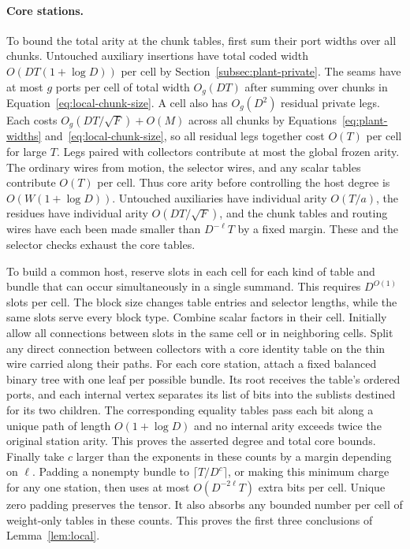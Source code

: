 \paragraph{Core stations.}
To bound the total arity at the chunk tables, first sum their port widths
over all chunks. Untouched auxiliary insertions have total coded width
\(O(DT(1+\log D))\) per cell by Section~\ref{subsec:plant-private}.
The seams have at most \(g\) ports per cell of total width \(O_g(DT)\)
after summing over chunks in Equation~\eqref{eq:local-chunk-size}.
A cell also has \(O_g(D^2)\) residual private legs. Each costs
\(O_g(DT/\sqrt F)+O(M)\) across all chunks by
Equations~\eqref{eq:plant-widths} and~\eqref{eq:local-chunk-size},
so all residual legs together cost \(O(T)\) per cell for large \(T\).
Legs paired with collectors contribute at most the global frozen arity.
The ordinary wires from motion, the selector wires, and any scalar
tables contribute \(O(T)\) per cell. Thus core arity before controlling the host
degree is \(O(W(1+\log D))\). Untouched auxiliaries have individual
arity \(O(T/a)\), the residues have individual arity
\(O(DT/\sqrt F)\), and the chunk tables and routing wires have each been
made smaller than \(D^{-\ell}T\) by a fixed margin. These and the
selector checks exhaust the core tables.

To build a common host, reserve slots in each cell for each kind of
table and bundle that can occur simultaneously in a single summand.
This requires \(D^{O(1)}\) slots per cell. The block size changes table
entries and selector lengths, while the same slots serve every block
type. Combine scalar factors in their cell. Initially allow all
connections between slots in the same cell or in neighboring cells.
Split any direct connection between collectors with a core identity table
on the thin wire carried along their paths. For each core station, attach a fixed balanced binary tree with one
leaf per possible bundle. Its root receives the table's ordered ports,
and each internal vertex separates its list of bits into the sublists
destined for its two children. The corresponding equality tables pass
each bit along a unique path of length \(O(1+\log D)\) and no internal arity exceeds
twice the original station arity. This proves the asserted degree and
total core bounds. Finally take \(c\) larger than the exponents in these
counts by a margin depending on \(\ell\). Padding a nonempty bundle to
\(\lceil T/D^c\rceil\), or making this minimum charge for any one
station, then uses at most \(O(D^{-2\ell}T)\) extra bits per cell.
Unique zero padding preserves the tensor. It also absorbs any bounded
number per cell of weight-only tables in these counts. This proves the first three
conclusions of Lemma~\ref{lem:local}.

